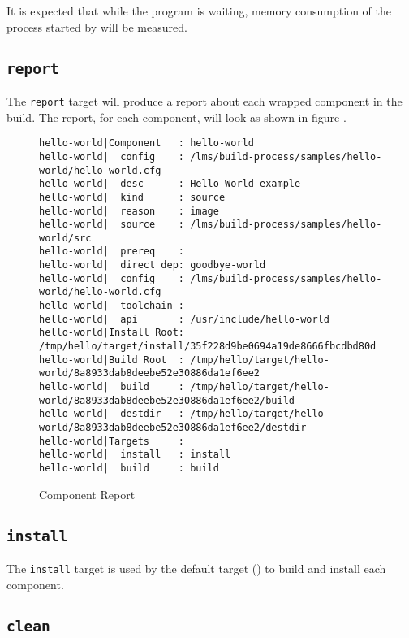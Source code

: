 It is expected that while the program is waiting, memory consumption
of the \make process started by \lmsbw will be measured.

\subsection{\texttt{report}}\label{usinglmsbw:report}

The \texttt{report} target will produce a report about each wrapped
component in the build.  The report, for each component, will look
as shown in figure .

\begin{landscape}
\begin{figure}
\hrulefill
\begin{small}
\begin{verbatim}
hello-world|Component   : hello-world
hello-world|  config    : /lms/build-process/samples/hello-world/hello-world.cfg
hello-world|  desc      : Hello World example
hello-world|  kind      : source
hello-world|  reason    : image
hello-world|  source    : /lms/build-process/samples/hello-world/src
hello-world|  prereq    :
hello-world|  direct dep: goodbye-world
hello-world|  config    : /lms/build-process/samples/hello-world/hello-world.cfg
hello-world|  toolchain :
hello-world|  api       : /usr/include/hello-world
hello-world|Install Root: /tmp/hello/target/install/35f228d9be0694a19de8666fbcdbd80d
hello-world|Build Root  : /tmp/hello/target/hello-world/8a8933dab8deebe52e30886da1ef6ee2
hello-world|  build     : /tmp/hello/target/hello-world/8a8933dab8deebe52e30886da1ef6ee2/build
hello-world|  destdir   : /tmp/hello/target/hello-world/8a8933dab8deebe52e30886da1ef6ee2/destdir
hello-world|Targets     :
hello-world|  install   : install
hello-world|  build     : build
\end{verbatim}
\end{small}
\hrulefill
\caption{Component Report}\label{usinglmsbw:component-report}
\end{figure}
\end{landscape}

\subsection{\texttt{install}}

The \texttt{install} target is used by the default target
() to build and install each component.

\subsection{\texttt{clean}}

